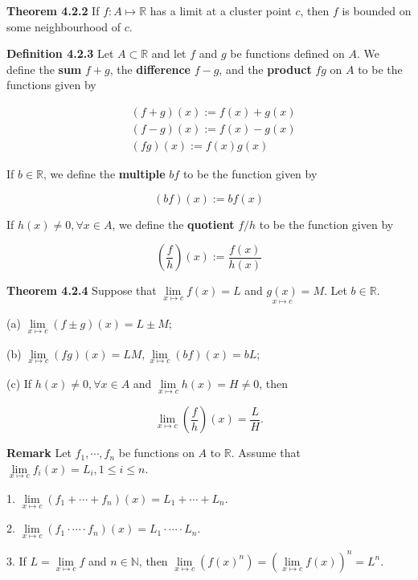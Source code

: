 \documentclass[10pt,landscape]{article}
\begin{document}
\begin{multicols}{4}
\textbf{Theorem 4.2.2} If $f : A \mapsto \mathbb{R}$ has a limit at a cluster point $c$, then $f$ is bounded on some neighbourhood of $c$.

\textbf{Definition 4.2.3} Let $A \subset \mathbb{R}$ and let $f$ and $g$ be functions defined on $A$. We define the \textbf{sum} $f + g$, the \textbf{difference} $f - g$, and the \textbf{product} $fg$ on $A$ to be the functions given by 

$$
\begin{aligned}
& (f+g)(x) := f(x) + g(x) \\
& (f-g)(x) := f(x) - g(x) \\
& (fg)(x) := f(x)g(x)
\end{aligned}
$$

If $b \in \mathbb{R}$, we define the \textbf{multiple} $bf$ to be the function given by 

$$
(bf)(x) := bf(x)
$$

If $h(x) \neq 0, \forall x \in A$, we define the \textbf{quotient} $f / h$ to be the function given by 

$$
(\frac{f}{h})(x) := \frac{f(x)}{h(x)}
$$

\textbf{Theorem 4.2.4} Suppose that $\underset{x \mapsto c}{\lim} f(x) = L$ and $\underset{x \mapsto c}{g(x)} = M$. Let $b \in \mathbb{R}$.

(a) $\underset{x \mapsto c}{\lim} (f \pm g)(x) = L \pm M$;

(b) $\underset{x \mapsto c}{\lim} (fg)(x) = LM, \underset{x \mapsto c}{\lim} (bf)(x) = bL$;

(c) If $h(x) \neq 0, \forall x \in A$ and $\underset{x \mapsto c}{\lim} h (x) = H \neq 0$, then 

$$
\underset{x \mapsto c}{\lim} (\frac{f}{h}) (x) = \frac{L}{H}.
$$

\textbf{Remark} Let $f_1, \cdots, f_n$ be functions on $A$ to $\mathbb{R}$. Assume that $\underset{x \mapsto c}{\lim} f_i(x) = L_i, 1 \leq i \leq n$.

1. $\underset{x \mapsto c}{\lim} (f_1 + \cdots + f_n) (x) = L_1 + \cdots + L_n$.

2. $\underset{x \mapsto c}{\lim} (f_1 \cdot \cdots \cdot f_n) (x) = L_1 \cdot \cdots \cdot L_n$.

3. If $L = \underset{x \mapsto c}{\lim} f$ and $n \in \mathbb{N}$, then $\underset{x \mapsto c}{\lim} (f(x)^n) = (\underset{x \mapsto c}{\lim} f(x))^n = L^n$.



\end{multicols}
\end{document}
